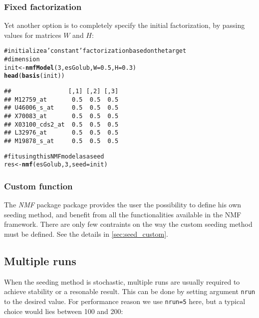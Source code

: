 \documentclass[a4paper]{article}\usepackage{graphicx, color}
\makeatletter
\newcommand{\hlfunctioncall}[1]{\textcolor[rgb]{0.501960784313725,0,0.329411764705882}{\textbf{#1}}}%
\newcommand{\hlstring}[1]{\textcolor[rgb]{0.6,0.6,1}{#1}}%
\newcommand{\hlcomment}[1]{\textcolor[rgb]{0.180392156862745,0.6,0.341176470588235}{#1}}%
\newenvironment{kframe}{%
 \def\at@end@of@kframe{}%
 \ifinner\ifhmode%
  \def\at@end@of@kframe{\end{minipage}}%
  \begin{minipage}{\columnwidth}%
 \fi\fi%
 \def\FrameCommand##1{\hskip\@totalleftmargin \hskip-\fboxsep
 \colorbox{shadecolor}{##1}\hskip-\fboxsep
     \hskip-\linewidth \hskip-\@totalleftmargin \hskip\columnwidth}%
 \MakeFramed {\advance\hsize-\width
   \@totalleftmargin\z@ \linewidth\hsize
   \@setminipage}}%
 {\par\unskip\endMakeFramed%
 \at@end@of@kframe}
\newenvironment{knitrout}{}{} %
\let\code=\texttt
\newcommand{\pkgname}[1]{\textit{#1}\xspace}
\newcommand{\Rpkg}[1]{\pkgname{#1} package\xspace}
\newcommand{\nmfpack}{\Rpkg{NMF}}
\makeatother
\begin{document}
\subsubsection{Fixed factorization}
Yet another option is to completely specify the initial factorization, by passing values for matrices $W$ and $H$:
\begin{knitrout}
\color{fgcolor}\begin{kframe}
\begin{alltt}
\hlcomment{# initialize a \hlstring{'constant'} factorization based on the target}
\hlcomment{# dimension}
init <- \hlfunctioncall{nmfModel}(3, esGolub, W = 0.5, H = 0.3)
\hlfunctioncall{head}(\hlfunctioncall{basis}(init))
\end{alltt}
\begin{verbatim}
##                [,1] [,2] [,3]
## M12759_at       0.5  0.5  0.5
## U46006_s_at     0.5  0.5  0.5
## X70083_at       0.5  0.5  0.5
## X03100_cds2_at  0.5  0.5  0.5
## L32976_at       0.5  0.5  0.5
## M19878_s_at     0.5  0.5  0.5
\end{verbatim}
\begin{alltt}

\hlcomment{# fit using this NMF model as a seed}
res <- \hlfunctioncall{nmf}(esGolub, 3, seed = init)
\end{alltt}
\end{kframe}
\end{knitrout}



\subsubsection{Custom function}
The \nmfpack package provides the user the possibility to define his own seeding method, and benefit from all the functionalities available in the NMF framework.
There are only few contraints on the way the custom seeding method must be defined.
See the details in \cref{sec:seed_custom}.

\subsection{Multiple runs}

When the seeding method is stochastic, multiple runs are usually required to achieve stability or a resonable result.
This can be done by setting argument \code{nrun} to the desired value. 
For performance reason we use \code{nrun=5} here, but a typical choice would lies between 100 and 200:  
\end{document}
